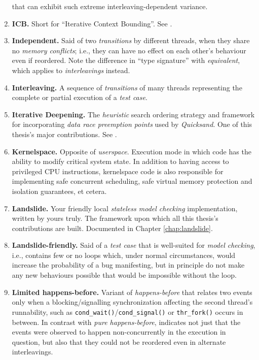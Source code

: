 \begin{enumerate}
		that can exhibit such extreme interleaving-dependent variance.
	\item {\bf ICB.} Short for ``Iterative Context Bounding''. See \sect{\ref{sec:landslide-icb}}.
	\item {\bf Independent.}
		Said of two {\em transitions} by different threads,
		when they share no {\em memory conflicts};
		i.e., they can have no effect on each other's behaviour even if reordered.
		Note the difference in ``type signature'' with {\em equivalent}, which applies to {\em interleavings} instead.
	\item {\bf Interleaving.}
		A sequence of {\em transitions} of many threads representing the complete or partial execution
		of a {\em test case}.
	\item {\bf Iterative Deepening.}
		The {\em heuristic} search ordering strategy and framework for incorporating {\em data race preemption points}
		used by {\em Quicksand}.
		One of this thesis's major contributions.
		See \sect{\ref{sec:quicksand-id}}.
	\item {\bf Kernelspace.}
		Opposite of {\em userspace}.
		Execution mode in which code has the ability to modify critical system state.
		In addition to having access to privileged CPU instructions,
		kernelspace code is also responsible for implementing safe
		concurrent scheduling, safe virtual memory protection and isolation guarantees, et cetera.
	\item {\bf Landslide.}
		Your friendly local {\em stateless model checking} implementation, written by yours truly.
		The framework upon which all this thesis's contributions are built.
		Documented in Chapter \ref{chap:landslide}.
	\item {\bf Landslide-friendly.}
		Said of a {\em test case} that is well-suited for {\em model checking},
		i.e.,
		contains few or no loops which,
		under normal circumstances, would increase the probability of a bug manifesting,
		but in principle do not make any new behaviours possible that would be impossible without the loop.
	\item {\bf Limited happens-before.}
		Variant of {\em happens-before} that relates two events only when a blocking/signalling synchronization affecting
		the second thread's runnability, such as {\tt cond\_wait()}/{\tt cond\_signal()} or {\tt thr\_fork()}
		occurs in between.
		In contrast with {\em pure happens-before},
		indicates not just that the events were observed
		to happen non-concurrently in the execution in question,
		but also that they could not be reordered even in alternate interleavings.

\end{enumerate}
